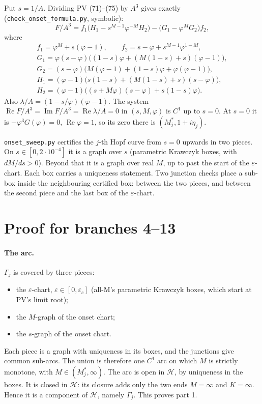 \documentclass[11pt,a4paper]{report}
\begin{document}
Put \(s=1/A\). Dividing PV (71)--(75) by \(A^3\) gives exactly (\texttt{check\_onset\_formula.py}, symbolic):
\[F/A^3=f_1\big(H_1-s^{M-1}\varphi^{-M}H_2\big)-\big(G_1-\varphi^MG_2\big)f_2,\]
where
\begin{gather*}
f_1=\varphi^M+s(\varphi-1),\qquad f_2=s-\varphi+s^{M-1}\varphi^{1-M},\\
G_1=\varphi(s-\varphi)\big((1-s)\varphi+(M(1-s)+s)(\varphi-1)\big),\\
G_2=(s-\varphi)\big(M(\varphi-1)+(1-s)\varphi+\varphi(\varphi-1)\big),\\
H_1=(\varphi-1)\big(s(1-s)+(M(1-s)+s)(s-\varphi)\big),\\
H_2=(\varphi-1)\big((s+M\varphi)(s-\varphi)+s(1-s)\varphi\big).
\end{gather*}
Also \(\lambda/A=(1-s/\varphi)(\varphi-1)\). The system \(\operatorname{Re}F/A^3=\operatorname{Im}F/A^3=
\operatorname{Re}\lambda/A=0\) in \((s,M,\varphi)\) is \(C^1\) up to \(s=0\). At \(s=0\) it is \(-\varphi^3G(\varphi)=0\),
\(\operatorname{Re}\varphi=1\), so its zero there is \((M^*_j,1+i\eta_j)\).

\texttt{onset\_sweep.py} certifies the \(j\)-th Hopf curve from \(s=0\) upwards in two pieces. On
\(s\in[0,2\cdot10^{-4}]\) it is a graph over \(s\) (parametric Krawczyk boxes, with \(dM/ds>0\)). Beyond that it is a
graph over real \(M\), up to past the start of the \(\varepsilon\)-chart. Each box carries a uniqueness statement.
Two junction checks place a sub-box inside the neighbouring certified box: between the two pieces, and between the
second piece and the last box of the \(\varepsilon\)-chart.

\section{Proof for branches 4--13}

\paragraph{The arc.} \(\Gamma_j\) is covered by three pieces:
\begin{itemize}
\item the \(\varepsilon\)-chart, \(\varepsilon\in[0,\varepsilon_c]\) (all-M's parametric Krawczyk boxes, which start at
PV's limit root);
\item the \(M\)-graph of the onset chart;
\item the \(s\)-graph of the onset chart.
\end{itemize}
Each piece is a graph with uniqueness in its boxes, and the junctions give common sub-arcs. The union is therefore one
\(C^1\) arc on which \(M\) is strictly monotone, with \(M\in(M^*_j,\infty)\). The arc is open in \(\mathcal H\), by
uniqueness in the boxes. It is closed in \(\mathcal H\): its closure adds only the two ends \(M=\infty\) and
\(K=\infty\). Hence it is a component of \(\mathcal H\), namely \(\Gamma_j\). This proves part 1.
\end{document}
